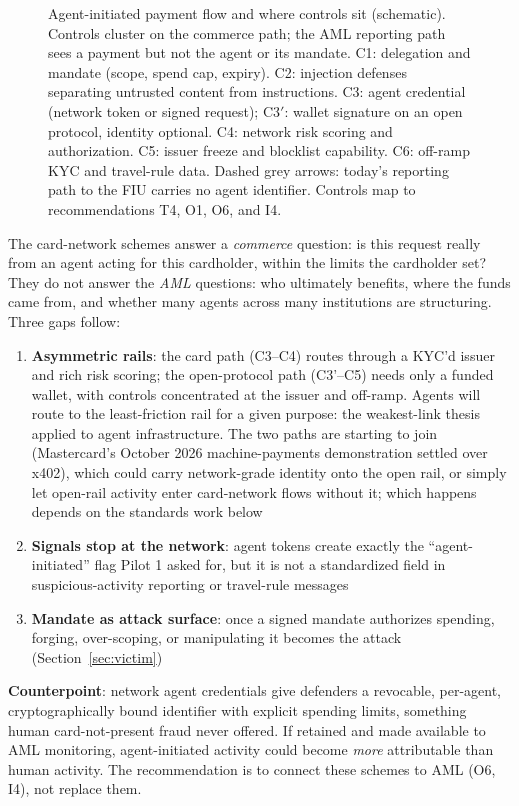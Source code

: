 \documentclass[11pt,letterpaper]{article}
\begin{document}
\begin{figure}[htbp]
\caption{Agent-initiated payment flow and where controls sit (schematic). Controls cluster on the commerce path; the AML reporting path sees a payment but not the agent or its mandate. C1: delegation and mandate (scope, spend cap, expiry). C2: injection defenses separating untrusted content from instructions. C3: agent credential (network token or signed request); C3$'$: wallet signature on an open protocol, identity optional. C4: network risk scoring and authorization. C5: issuer freeze and blocklist capability. C6: off-ramp KYC and travel-rule data. Dashed grey arrows: today's reporting path to the FIU carries no agent identifier. Controls map to recommendations T4, O1, O6, and I4.}
\label{fig:agentflow}
\end{figure}

\begin{keybox}
The card-network schemes answer a \textit{commerce} question: is this request really from an agent acting for this cardholder, within the limits the cardholder set? They do not answer the \textit{AML} questions: who ultimately benefits, where the funds came from, and whether many agents across many institutions are structuring. Three gaps follow:
\begin{enumerate}
  \item \textbf{Asymmetric rails}: the card path (C3--C4) routes through a KYC'd issuer and rich risk scoring; the open-protocol path (C3'--C5) needs only a funded wallet, with controls concentrated at the issuer and off-ramp. Agents will route to the least-friction rail for a given purpose: the weakest-link thesis applied to agent infrastructure. The two paths are starting to join (Mastercard's October 2026 machine-payments demonstration settled over x402), which could carry network-grade identity onto the open rail, or simply let open-rail activity enter card-network flows without it; which happens depends on the standards work below
  \item \textbf{Signals stop at the network}: agent tokens create exactly the ``agent-initiated'' flag Pilot 1 asked for, but it is not a standardized field in suspicious-activity reporting or travel-rule messages
  \item \textbf{Mandate as attack surface}: once a signed mandate authorizes spending, forging, over-scoping, or manipulating it becomes the attack (Section~\ref{sec:victim})
\end{enumerate}
\textbf{Counterpoint}: network agent credentials give defenders a revocable, per-agent, cryptographically bound identifier with explicit spending limits, something human card-not-present fraud never offered. If retained and made available to AML monitoring, agent-initiated activity could become \textit{more} attributable than human activity. The recommendation is to connect these schemes to AML (O6, I4), not replace them.
\end{keybox}
\end{document}
